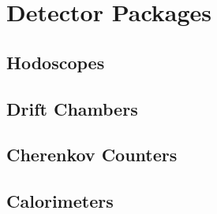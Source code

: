 \section{Detector Packages}
\lipsum[1-2]

\subsection{Hodoscopes}
\lipsum[1-2]

\subsection{Drift Chambers}
\lipsum[1-2]

\subsection{Cherenkov Counters}
\lipsum[1-2]

\subsection{Calorimeters}
\lipsum[1-2]
